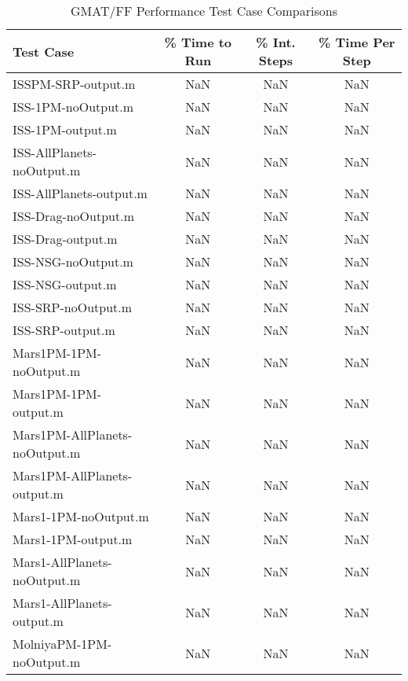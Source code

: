 \begin{table}[htbp!]
\centering
\caption{ GMAT/FF Performance Test Case Comparisons}
      \begin{tabular}{lccc}
      \hline\hline
          Test Case & \% Time to Run & \% Int. Steps & \% Time Per Step \\
         \hline
         ISSPM-SRP-output.m & NaN & NaN & NaN \\
         ISS-1PM-noOutput.m & NaN & NaN & NaN \\
         ISS-1PM-output.m & NaN & NaN & NaN \\
         ISS-AllPlanets-noOutput.m & NaN & NaN & NaN \\
         ISS-AllPlanets-output.m & NaN & NaN & NaN \\
         ISS-Drag-noOutput.m & NaN & NaN & NaN \\
         ISS-Drag-output.m & NaN & NaN & NaN \\
         ISS-NSG-noOutput.m & NaN & NaN & NaN \\
         ISS-NSG-output.m & NaN & NaN & NaN \\
         ISS-SRP-noOutput.m & NaN & NaN & NaN \\
         ISS-SRP-output.m & NaN & NaN & NaN \\
         Mars1PM-1PM-noOutput.m & NaN & NaN & NaN \\
         Mars1PM-1PM-output.m & NaN & NaN & NaN \\
         Mars1PM-AllPlanets-noOutput.m & NaN & NaN & NaN \\
         Mars1PM-AllPlanets-output.m & NaN & NaN & NaN \\
         Mars1-1PM-noOutput.m & NaN & NaN & NaN \\
         Mars1-1PM-output.m & NaN & NaN & NaN \\
         Mars1-AllPlanets-noOutput.m & NaN & NaN & NaN \\
         Mars1-AllPlanets-output.m & NaN & NaN & NaN \\
         MolniyaPM-1PM-noOutput.m & NaN & NaN & NaN \\

\end{tabular}
\end{table}
